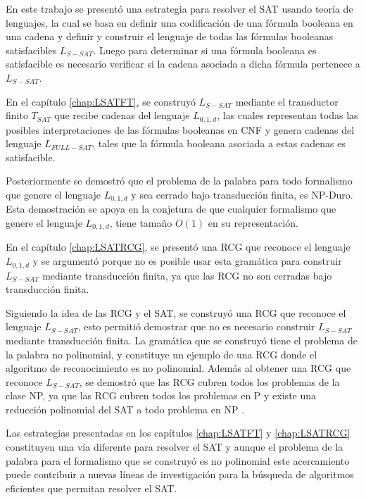 \begin{conclusions}
    En este trabajo se presentó una estrategia para resolver el SAT usando teoría de lenguajes, la cual se basa en definir
    una codificación de una fórmula booleana en una cadena y definir y construir el lenguaje de todas las fórmulas booleanas
    satisfacibles $L_{S-SAT}$. Luego para determinar si una fórmula booleana es satisfacible es necesario verificar si la cadena asociada
    a dicha fórmula pertenece a $L_{S-SAT}$.
    
    En el capítulo \ref{chap:LSATFT}, se construyó $L_{S-SAT}$ mediante el transductor finito $T_{SAT}$ que recibe
    cadenas del lenguaje $L_{0,1,d}$, las cuales representan todas las posibles interpretaciones de las fórmulas
    booleanas en CNF y genera cadenas del lenguaje $L_{FULL-SAT}$, tales que la fórmula booleana asociada a estas
    cadenas es satisfacible.
    
    Posteriormente se demostró que el problema de la palabra para todo formalismo que genere
    el lenguaje $L_{0,1,d}$ y sea cerrado bajo transducción finita, es NP-Duro. Esta demostración se apoya en la conjetura
    de que cualquier formalismo que genere el lenguaje $L_{0,1,d}$, tiene tamaño $O(1)$ en su representación.
    
    En el capítulo \ref{chap:LSATRCG}, se presentó una RCG que reconoce el lenguaje $L_{0,1,d}$ y se argumentó porque no es posible
    usar esta gramática para construir $L_{S-SAT}$ mediante transducción finita, ya que las RCG no son cerradas bajo transducción finita.
    
    Siguiendo la idea de las RCG y el SAT, se construyó una RCG que reconoce el lenguaje $L_{S-SAT}$, esto permitió demostrar
    que no es necesario construir $L_{S-SAT}$ mediante transducción finita. La gramática que se construyó tiene el problema
    de la palabra no polinomial, y constituye un ejemplo de una RCG donde el algoritmo de reconocimiento es no polinomial.
    Además al obtener una RCG que reconoce $L_{S-SAT}$, se demostró que las RCG cubren todos los problemas de la clase NP,
    ya que las RCG cubren todos los problemas en P \cite{mainRCGBib} y existe una reducción polinomial del SAT a todo problema en NP \cite{authomataTheory}.
    
    Las estrategias presentadas en los capítulos \ref{chap:LSATFT} y \ref{chap:LSATRCG} constituyen una vía diferente
    para resolver el SAT y aunque el problema de la palabra para el formalismo que se construyó es no polinomial
    este acercamiento puede contribuir a nuevas líneas de investigación para la búsqueda de algoritmos eficientes que permitan
    resolver el SAT.   
    
\end{conclusions}
